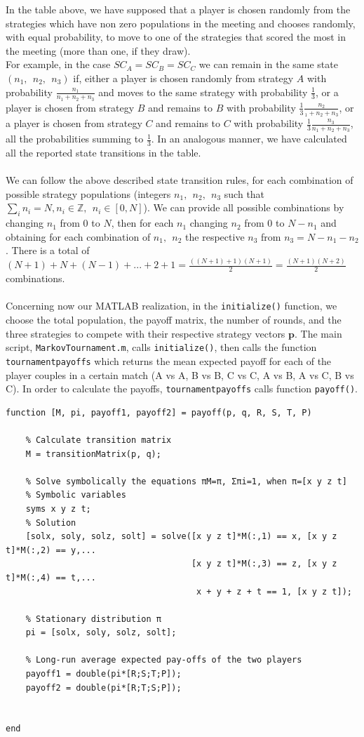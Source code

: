 \documentclass[12pt]{article}
\begin{document}
In the table above, we have supposed that a player is chosen randomly from the strategies which have non zero populations in the meeting and chooses randomly, with equal probability, to move to one of the strategies that scored the most in the meeting (more than one, if they draw).
\\
For example, in the case $SC_A=SC_B=SC_C$ we can remain in the same state $(n_1,\ \ n_2,\ \ n_3)$ if, either a player is chosen randomly from strategy $A$ with probability $\frac{n_1}{n_1+n_2+n_3}$ and moves to the same strategy with probability $\frac{1}{3}$, or a player is chosen from strategy $B$ and remains to $B$ with probability $\frac{1}{3}\frac{n_2}{_1+n_2+n_3}$, or a player is chosen from strategy $C$ and remains to $C$ with probability $\frac{1}{3}\frac{n_3}{n_1+n_2+n_3}$, all the probabilities summing to $\frac{1}{3}$. In an analogous manner, we have calculated all the reported state transitions in the table.
\\\\
We can follow the above described state transition rules, for each combination of possible strategy populations (integers $n_1, \ \ n_2, \ \ n_3$ such that $\sum_{i}n_i=N, n_i\in \mathbb{Z},\ \ n_i\in [0,N]$). We can provide all possible combinations by changing $n_1$ from $0$ to $N$, then for each $n_1$ changing $n_2$ from $0$ to $N-n_1$ and obtaining for each combination of $n_1, \ \ n_2$ the respective $n_3$ from $n_3=N-n_1-n_2$. There is a total of $(N+1)+N+(N-1)+...+2+1=\frac{((N+1)+1)(N+1)}{2}=\frac{(N+1)(N+2)}{2}$ combinations.
\\\\
Concerning now our MATLAB realization, in the \texttt{initialize()} function, we choose the total population, the payoff matrix, the number of rounds, and the three strategies to compete with their respective strategy vectors $\mathbf{p}$. The main script, \texttt{MarkovTournament.m}, calls \texttt{initialize()}, then calls the function \texttt{tournamentpayoffs} which returns the mean expected payoff for each of the player couples in a certain match (A vs A, B vs B, C vs C, A vs B, A vs C, B vs C). In order to calculate the payoffs, \texttt{tournamentpayoffs} calls function \texttt{payoff()}.
\begin{lstlisting}[caption=Function payoff]
    function [M, pi, payoff1, payoff2] = payoff(p, q, R, S, T, P)
    
    % Calculate transition matrix 
    M = transitionMatrix(p, q);

    % Solve symbolically the equations πM=π, Σπi=1, when π=[x y z t]
    % Symbolic variables
    syms x y z t;
    % Solution
    [solx, soly, solz, solt] = solve([x y z t]*M(:,1) == x, [x y z t]*M(:,2) == y,...
                                     [x y z t]*M(:,3) == z, [x y z t]*M(:,4) == t,...
                                      x + y + z + t == 1, [x y z t]);
    
    % Stationary distribution π
    pi = [solx, soly, solz, solt];

    % Long-run average expected pay-offs of the two players
    payoff1 = double(pi*[R;S;T;P]);
    payoff2 = double(pi*[R;T;S;P]);


end
\end{lstlisting}
\end{document}
